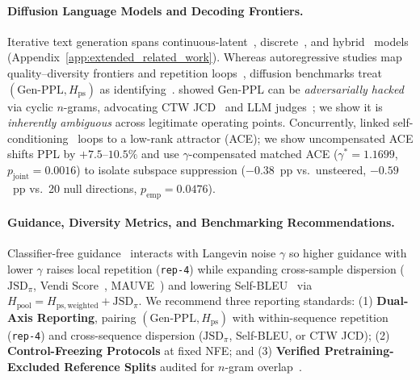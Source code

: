 \documentclass[11pt,a4paper]{article}
\begin{document}
\paragraph{Diffusion Language Models and Decoding Frontiers.}
Iterative text generation spans continuous-latent~\citep{li2022diffusionlm,dieleman2022cdcd,gulrajani2023plaid,lovelace2023ld4lg,hu2026elf,jiang2026textldm,guo2026coladlm}, discrete~\citep{lou2024sedd,sahoo2024mdlm,zheng2025masked,sahoo2025duo,wang2025remdm}, and hybrid~\citep{pynadath2025candi,zhou2025ccdd} models (Appendix~\ref{app:extended_related_work}). Whereas autoregressive studies map quality--diversity frontiers and repetition loops~\citep{holtzman2020curious,caccia2020language,nadeem2020systematic,basu2021mirostat,xu2022learning}, diffusion benchmarks treat $(\text{Gen-PPL}, H_{\mathrm{ps}})$ as identifying~\citep{pynadath2026generative}. \citet{franca2026hacking} showed Gen-PPL can be \emph{adversarially hacked} via cyclic $n$-grams, advocating CTW JCD~\citep{willems1995context} and LLM judges~\citep{zheng2023judging}; we show it is \emph{inherently ambiguous} across legitimate operating points. Concurrently, \citet{zhang2026selfcond} linked self-conditioning~\citep{chen2023analog} loops to a low-rank attractor (ACE); we show uncompensated ACE shifts PPL by $+7.5\text{--}10.5\%$ and use $\gamma$-compensated matched ACE ($\gamma^*=1.1699$, $p_{\mathrm{joint}}=0.0016$) to isolate subspace suppression ($-0.38$~pp vs.\ unsteered, $-0.59$~pp vs.\ 20 null directions, $p_{\mathrm{emp}}=0.0476$).

\paragraph{Guidance, Diversity Metrics, and Benchmarking Recommendations.}
Classifier-free guidance~\citep{ho2022classifier} interacts with Langevin noise $\gamma$ so higher guidance with lower $\gamma$ raises local repetition (\texttt{rep-4}) while expanding cross-sample dispersion ($\mathrm{JSD}_\pi$, Vendi Score~\citep{friedman2023vendi}, MAUVE~\citep{pillutla2021mauve,pimentel2023usefulness}) and lowering Self-BLEU~\citep{zhu2018texygen,caccia2020language} via $H_{\mathrm{pool}} = H_{\mathrm{ps,weighted}} + \mathrm{JSD}_{\pi}$. We recommend three reporting standards: (1) \textbf{Dual-Axis Reporting}, pairing $(\text{Gen-PPL}, H_{\mathrm{ps}})$ with within-sequence repetition (\texttt{rep-4}) and cross-sequence dispersion ($\mathrm{JSD}_\pi$, Self-BLEU, or CTW JCD); (2) \textbf{Control-Freezing Protocols} at fixed NFE; and (3) \textbf{Verified Pretraining-Excluded Reference Splits} audited for $n$-gram overlap~\citep{brown2020language}.
\label{sec:end_of_main}
\end{document}
